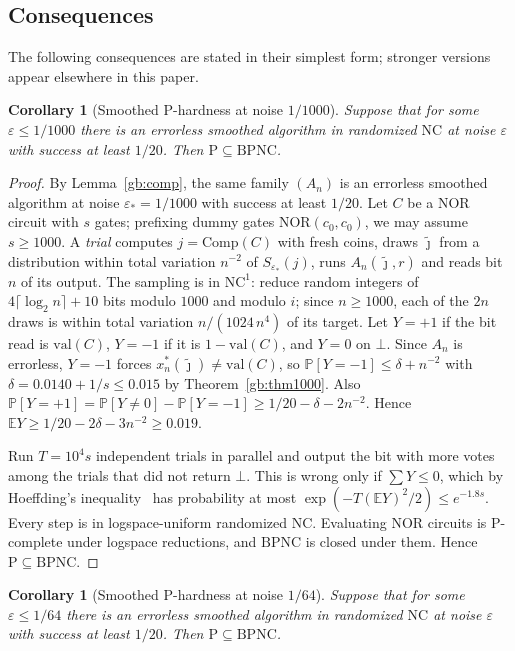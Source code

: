 \documentclass[11pt]{amsart}
\newtheorem{corollary}[theorem]{Corollary}
\theoremstyle{definition}
\theoremstyle{remark}
\newcommand{\eps}{\varepsilon}
\newcommand{\jt}{\tilde{\jmath}}
\newcommand{\NOR}{\mathrm{NOR}}
\newcommand{\val}{\mathrm{val}}
\newcommand{\PP}{\mathbb{P}}
\newcommand{\EE}{\mathbb{E}}
\newcommand{\Comp}{\mathrm{Comp}}
\begin{document}
\subsection{Consequences}\label{gb:sec-cons}

The following consequences are stated in their simplest form; stronger
versions appear elsewhere in this paper.

\begin{corollary}[Smoothed P-hardness at noise $1/1000$]\label{gb:cor1000}
Suppose that for some $\eps\le1/1000$ there is an errorless smoothed
algorithm in randomized $\mathrm{NC}$ at noise $\eps$ with success at least
$1/20$. Then $\mathrm{P}\subseteq\mathrm{BPNC}$.
\end{corollary}

\begin{proof}
By Lemma~\ref{gb:comp}, the same family $(A_n)$ is an errorless smoothed
algorithm at noise $\eps_*=1/1000$ with success at least $1/20$. Let $C$ be
a NOR circuit with $s$ gates; prefixing dummy gates $\NOR(c_0,c_0)$, we may
assume $s\ge1000$. A \emph{trial} computes $j=\Comp(C)$ with fresh coins,
draws $\jt$ from a distribution within total variation $n^{-2}$ of
$S_{\eps_*}(j)$, runs $A_n(\jt,r)$ and reads bit $n$ of its output. The
sampling is in $\mathrm{NC}^1$: reduce random integers of
$4\lceil\log_2 n\rceil+10$ bits modulo $1000$ and modulo $i$; since
$n\ge1000$, each of the $2n$ draws is within total variation
$n/(1024\,n^4)$ of its target.
Let $Y=+1$ if the bit read is $\val(C)$, $Y=-1$ if it is $1-\val(C)$, and
$Y=0$ on $\bot$. Since $A_n$ is errorless, $Y=-1$ forces
$x^*_n(\jt)\ne\val(C)$, so $\PP[Y=-1]\le\delta+n^{-2}$ with
$\delta=0.0140+1/s\le0.015$ by Theorem~\ref{gb:thm1000}. Also
$\PP[Y=+1]=\PP[Y\ne0]-\PP[Y=-1]\ge1/20-\delta-2n^{-2}$. Hence
$\EE Y\ge1/20-2\delta-3n^{-2}\ge0.019$.

Run $T=10^4s$ independent trials in parallel and output the bit with more
votes among the trials that did not return $\bot$. This is wrong only if
$\sum Y\le0$, which by Hoeffding's inequality~\cite{hoeffding} has
probability at most $\exp(-T(\EE Y)^2/2)\le e^{-1.8s}$. Every step is in
logspace-uniform randomized $\mathrm{NC}$. Evaluating NOR circuits is
$\mathrm{P}$-complete under logspace reductions, and $\mathrm{BPNC}$ is
closed under them. Hence $\mathrm{P}\subseteq\mathrm{BPNC}$.
\end{proof}

\begin{corollary}[Smoothed P-hardness at noise $1/64$]\label{gb:cor64}
Suppose that for some $\eps\le1/64$ there is an errorless smoothed algorithm
in randomized $\mathrm{NC}$ at noise $\eps$ with success at least $1/20$.
Then $\mathrm{P}\subseteq\mathrm{BPNC}$.
\end{corollary}
\end{document}
